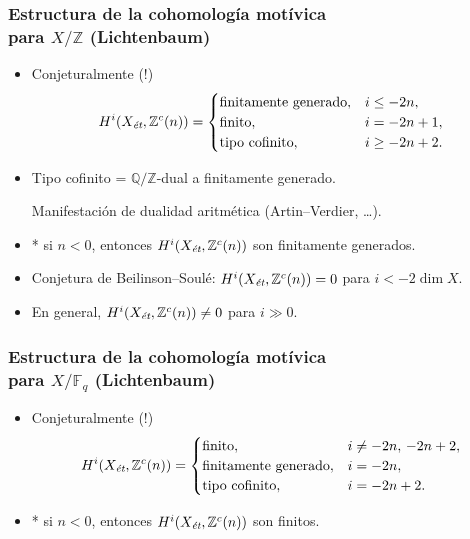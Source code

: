 \documentclass[handout]{beamer}
\newcommand{\FF}{\mathbb{F}}
\newcommand{\QQ}{\mathbb{Q}}
\newcommand{\ZZ}{\mathbb{Z}}
\newcommand{\et}{\text{\it ét}}
\begin{document}
\begin{frame}
  \frametitle{Estructura de la cohomología motívica\\para $X/\ZZ$ (Lichtenbaum)}

  \begin{itemize}
  \item<2-> Conjeturalmente (!)
    \[ H^i (X_\et, \ZZ^c (n)) = \begin{cases}
        \text{finitamente generado}, & i \le -2n, \\
        \text{finito}, & i = -2n + 1, \\
        \text{tipo cofinito}, & i \ge -2n + 2.
    \end{cases} \]

  \item<3-> Tipo cofinito = $\QQ/\ZZ$-dual a finitamente generado.

    Manifestación de dualidad aritmética (Artin--Verdier, \ldots).

  \item<4-> * si $n < 0$, entonces $H^i (X_\et, \ZZ^c (n))$ son finitamente generados.

  \item<5-> Conjetura de Beilinson--Soulé: $H^i (X_\et, \ZZ^c (n)) = 0$ para
    $i < -2\dim X$.

  \item<6-> En general, $H^i (X_\et, \ZZ^c (n)) \ne 0$ para $i \gg 0$.
  \end{itemize}
\end{frame}


\begin{frame}
  \frametitle{Estructura de la cohomología motívica\\para $X/\FF_q$ (Lichtenbaum)}

  \begin{itemize}
  \item<2-> Conjeturalmente (!)
    \[ H^i (X_\et, \ZZ^c (n)) = \begin{cases}
        \text{finito}, & i \ne -2n, \, -2n+2, \\
        \text{finitamente generado}, & i = -2n, \\
        \text{tipo cofinito}, & i = -2n + 2.
      \end{cases} \]

  \item<3-> * si $n < 0$, entonces $H^i (X_\et, \ZZ^c (n))$ son finitos.
  \end{itemize}
\end{frame}
\end{document}
